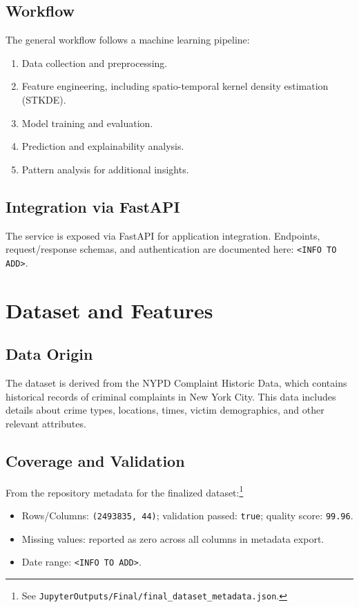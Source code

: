 \documentclass{article}
\begin{document}
\subsection{Workflow}
The general workflow follows a machine learning pipeline:
\begin{enumerate}
\item Data collection and preprocessing.
\item Feature engineering, including spatio-temporal kernel density estimation (STKDE).
\item Model training and evaluation.
\item Prediction and explainability analysis.
\item Pattern analysis for additional insights.
\end{enumerate}

\subsection{Integration via FastAPI}
The service is exposed via FastAPI for application integration. Endpoints, request/response schemas, and authentication are documented here: \texttt{<INFO TO ADD>}.

\section{Dataset and Features}

\subsection{Data Origin}
The dataset is derived from the NYPD Complaint Historic Data, which contains historical records of criminal complaints in New York City. This data includes details about crime types, locations, times, victim demographics, and other relevant attributes.

\subsection{Coverage and Validation}
From the repository metadata for the finalized dataset:\footnote{See \texttt{JupyterOutputs/Final/final\_dataset\_metadata.json}.}
\begin{itemize}
	\item Rows/Columns: \texttt{(2493835, 44)}; validation passed: \texttt{true}; quality score: \texttt{99.96}.
	\item Missing values: reported as zero across all columns in metadata export.
	\item Date range: \texttt{<INFO TO ADD>}.
\end{itemize}
\end{document}

